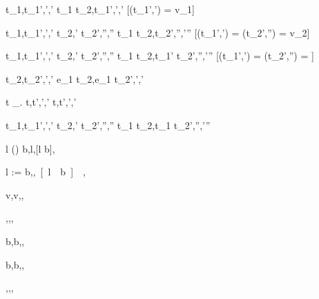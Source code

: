 
  {t_1,\sigma  \normalise t_1',\sigma',\delta'}
  {t_1 \Choose t_2,\sigma \normalise t_1',\sigma',\delta'}
  [\Value(t_1',\sigma') = v_1]

  {t_1,\sigma  \normalise t_1',\sigma',\delta'  \Quad
   t_2,\sigma' \normalise t_2',\sigma'',\delta''}
  {t_1 \Choose t_2,\sigma \normalise t_2',\sigma'',\delta'\cup\delta''}
  [\Value(t_1',\sigma') = \bot \land \Value(t_2',\sigma'') = v_2]

  {t_1,\sigma  \normalise t_1',\sigma',\delta'  \Quad
   t_2,\sigma' \normalise t_2',\sigma'',\delta''}
  {t_1 \Choose t_2,\sigma \normalise t_1' \Choose t_2',\sigma'',\delta'\cup\delta''}
  [\Value(t_1',\sigma') = \bot \land \Value(t_2',\sigma'') = \bot]



	{t_2,\sigma \normalise t_2',\sigma',\delta'}
	{e_1 \Trans t_2,\sigma \normalise e_1 \Trans t_2',\sigma',\delta'}

	{t \Step \lambda\_. \Forever t,\sigma \normalise t',\sigma',\delta'}
	{\Forever t,\sigma \normalise t',\sigma',\delta'}

	{t_1,\sigma \normalise t_1',\sigma',\delta' \Quad
	 t_2,\sigma' \normalise t_2',\sigma'',\delta''}
	{t_1 \Pair t_2,\sigma \normalise t_1 \Pair t_2',\sigma'',\delta'\cup\delta''}




	{l \not\in {}(\sigma)}
	{\New b,\sigma \normalise \Done l,[l \mapsto b]\sigma,\nothing}

	{}
	{l := b,\sigma \normalise \Done \unit,[l \mapsto b]\sigma,}



  { }
  {\Done v,\sigma \normalise \Done v,\sigma,\nothing}

  { }
  {\Enter \beta,\sigma \normalise \Enter \beta,\sigma,\nothing}

  { }
  {\Update b,\sigma \normalise \Update b,\sigma,\nothing}

  { }
  {\View b,\sigma \normalise \View b,\sigma,\nothing}

  { }
  {\Pick {},\sigma \normalise \Pick {},\sigma,\nothing}

